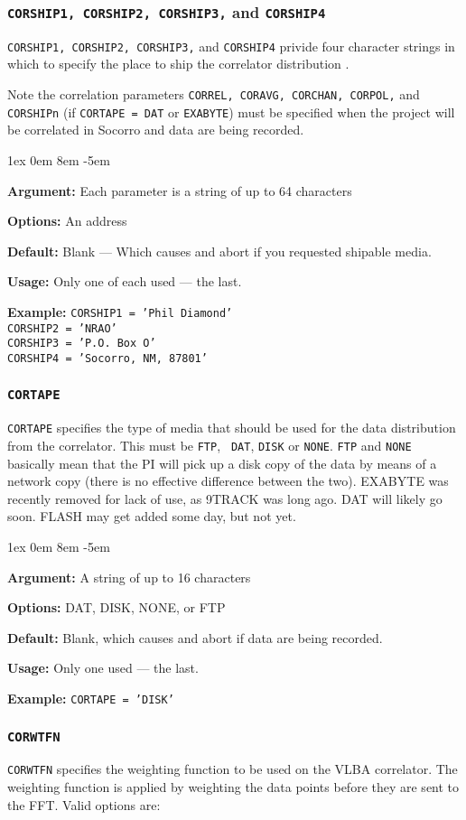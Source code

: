 \documentclass{report}
\newcommand{\rcwbox}[5]{
  \begin{list}{}{\parsep 1ex  \itemsep 0em
                 \leftmargin 8em  \itemindent -5em }
    \item {\bf Argument:} #1
    \item {\bf Options:}  #2
    \item {\bf Default:}  #3
    \item {\bf Usage:}    #4
    \item {\bf Example:}  #5
  \end{list}
}
\begin{document}
\subsubsection{\label{MP:CORSHIP}
{\tt CORSHIP1, CORSHIP2, CORSHIP3,} and {\tt CORSHIP4}}

{\tt CORSHIP1, CORSHIP2, CORSHIP3,} and {\tt CORSHIP4} privide four
character strings in which to specify the place to ship the
correlator distribution .

Note the correlation parameters {\tt CORREL, CORAVG, CORCHAN,
CORPOL,} and {\tt CORSHIPn} (if {\tt CORTAPE = DAT} or {\tt EXABYTE}) must
be specified when the project will be correlated in Socorro and data
are being recorded.

\rcwbox
{Each parameter is a string of up to 64 characters}
{An address}
{Blank --- Which causes and abort if you requested shipable media.}
{Only one of each used --- the last.}
{{\tt CORSHIP1 = 'Phil Diamond' }\\
{\tt CORSHIP2 = 'NRAO'} \\
{\tt CORSHIP3 = 'P.O. Box O' } \\
{\tt CORSHIP4 = 'Socorro, NM, 87801' } }

\subsubsection{\label{MP:CORTAPE}{\tt CORTAPE}}

{\tt CORTAPE} specifies the type of media that should be used for the
data distribution from the correlator.  This must be {\tt FTP}, {\tt
DAT}, {\tt DISK} or {\tt NONE}.  {\tt FTP} and {\tt NONE} basically
mean that the PI will pick up a disk copy of the data by means of a
network copy (there is no effective difference between the two).
EXABYTE was recently removed for lack of use, as 9TRACK was long ago.
DAT will likely go soon.  FLASH may get added some day, but not yet.  

\rcwbox
{A string of up to 16 characters}
{DAT, DISK, NONE, or FTP}
{Blank, which causes and abort if data are being recorded.}
{Only one used --- the last.}
{{\tt CORTAPE = 'DISK'}}

\subsubsection{\label{MP:CORWTFN}{\tt CORWTFN}}

{\tt CORWTFN} specifies the weighting function to be used on the VLBA
correlator.  The weighting function is applied by weighting the data
points before they are sent to the FFT.  Valid options are:
\end{document}
